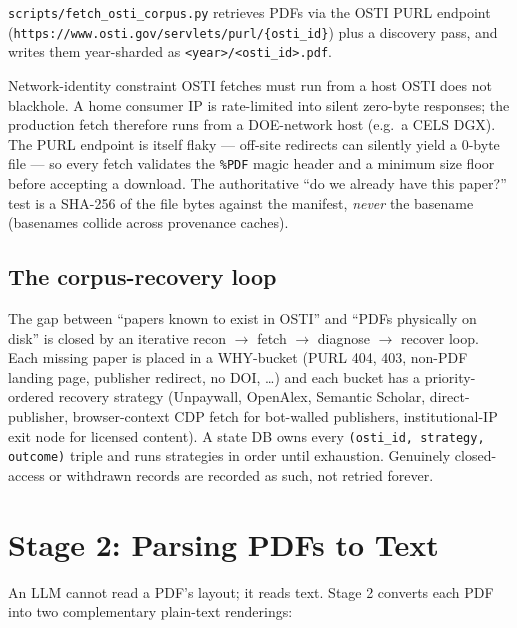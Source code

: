 \documentclass[11pt,letterpaper]{article}
\newcommand{\code}[1]{\texttt{\small #1}}
\begin{document}
\code{scripts/fetch\_osti\_corpus.py} retrieves PDFs via the OSTI PURL endpoint
(\code{https://www.osti.gov/servlets/purl/\{osti\_id\}}) plus a discovery pass, and
writes them year-sharded as \code{<year>/<osti\_id>.pdf}.

\begin{rulebox}{Network-identity constraint}
OSTI fetches must run from a host OSTI does not blackhole. A home consumer IP is
rate-limited into silent zero-byte responses; the production fetch therefore runs
from a DOE-network host (e.g.\ a CELS DGX). The PURL endpoint is itself flaky ---
off-site redirects can silently yield a 0-byte file --- so every fetch validates the
\code{\%PDF} magic header and a minimum size floor before accepting a download. The
authoritative ``do we already have this paper?'' test is a SHA-256 of the file
bytes against the manifest, \emph{never} the basename (basenames collide across
provenance caches).
\end{rulebox}

\subsection{The corpus-recovery loop}

The gap between ``papers known to exist in OSTI'' and ``PDFs physically on disk'' is
closed by an iterative recon $\rightarrow$ fetch $\rightarrow$ diagnose $\rightarrow$
recover loop. Each missing paper is placed in a WHY-bucket (PURL 404, 403, non-PDF
landing page, publisher redirect, no DOI, \ldots) and each bucket has a priority-ordered
recovery strategy (Unpaywall, OpenAlex, Semantic Scholar, direct-publisher,
browser-context CDP fetch for bot-walled publishers, institutional-IP exit node for
licensed content). A state DB owns every \code{(osti\_id, strategy, outcome)} triple
and runs strategies in order until exhaustion. Genuinely closed-access or withdrawn
records are recorded as such, not retried forever.

\clearpage
\section{Stage 2: Parsing PDFs to Text}

An LLM cannot read a PDF's layout; it reads text. Stage 2 converts each PDF into two
complementary plain-text renderings:
\end{document}
